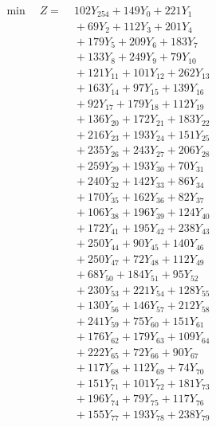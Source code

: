 \documentclass[a4paper,10pt]{article}
\begin{document}
\allowdisplaybreaks
{\small
\begin{align}
\min \quad Z = &\; 102 Y_{254} + 149 Y_{0} + 221 Y_{1} \\[0.3ex]
&\;  + 69 Y_{2} + 112 Y_{3} + 201 Y_{4} \\[0.3ex]
&\;  + 179 Y_{5} + 209 Y_{6} + 183 Y_{7} \\[0.3ex]
&\;  + 133 Y_{8} + 249 Y_{9} + 79 Y_{10} \\[0.3ex]
&\;  + 121 Y_{11} + 101 Y_{12} + 262 Y_{13} \\[0.3ex]
&\;  + 163 Y_{14} + 97 Y_{15} + 139 Y_{16} \\[0.3ex]
&\;  + 92 Y_{17} + 179 Y_{18} + 112 Y_{19} \\[0.3ex]
&\;  + 136 Y_{20} + 172 Y_{21} + 183 Y_{22} \\[0.3ex]
&\;  + 216 Y_{23} + 193 Y_{24} + 151 Y_{25} \\[0.3ex]
&\;  + 235 Y_{26} + 243 Y_{27} + 206 Y_{28} \\[0.5ex]\allowbreak
&\;  + 259 Y_{29} + 193 Y_{30} + 70 Y_{31} \\[0.3ex]
&\;  + 240 Y_{32} + 142 Y_{33} + 86 Y_{34} \\[0.3ex]
&\;  + 170 Y_{35} + 162 Y_{36} + 82 Y_{37} \\[0.3ex]
&\;  + 106 Y_{38} + 196 Y_{39} + 124 Y_{40} \\[0.3ex]
&\;  + 172 Y_{41} + 195 Y_{42} + 238 Y_{43} \\[0.3ex]
&\;  + 250 Y_{44} + 90 Y_{45} + 140 Y_{46} \\[0.3ex]
&\;  + 250 Y_{47} + 72 Y_{48} + 112 Y_{49} \\[0.3ex]
&\;  + 68 Y_{50} + 184 Y_{51} + 95 Y_{52} \\[0.3ex]
&\;  + 230 Y_{53} + 221 Y_{54} + 128 Y_{55} \\[0.3ex]
&\;  + 130 Y_{56} + 146 Y_{57} + 212 Y_{58} \\[0.5ex]\allowbreak
&\;  + 241 Y_{59} + 75 Y_{60} + 151 Y_{61} \\[0.3ex]
&\;  + 176 Y_{62} + 179 Y_{63} + 109 Y_{64} \\[0.3ex]
&\;  + 222 Y_{65} + 72 Y_{66} + 90 Y_{67} \\[0.3ex]
&\;  + 117 Y_{68} + 112 Y_{69} + 74 Y_{70} \\[0.3ex]
&\;  + 151 Y_{71} + 101 Y_{72} + 181 Y_{73} \\[0.3ex]
&\;  + 196 Y_{74} + 79 Y_{75} + 117 Y_{76} \\[0.3ex]
&\;  + 155 Y_{77} + 193 Y_{78} + 238 Y_{79} \\[0.3ex]

\end{align}}
\end{document}
